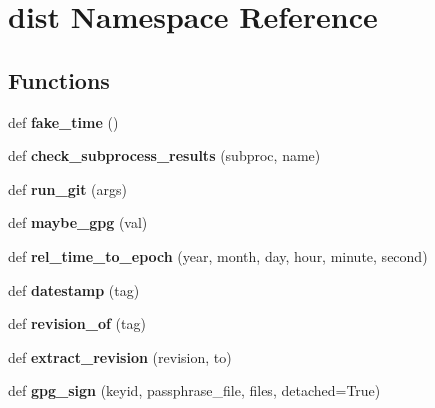 \hypertarget{namespacedist}{}\section{dist Namespace Reference}
\label{namespacedist}
\subsection*{Functions}
\begin{DoxyCompactItemize}
\item 
\mbox{\label{namespacedist_abacdc32a57a28af799d1d1c667ca5993}} 
def {\bfseries fake\+\_\+time} ()
\item 
\mbox{\label{namespacedist_a73d52a90d4d282ed503a285bb8e6e854}} 
def {\bfseries check\+\_\+subprocess\+\_\+results} (subproc, name)
\item 
\mbox{\label{namespacedist_a6e578877c9b9c9e4423cc15a77379406}} 
def {\bfseries run\+\_\+git} (args)
\item 
\mbox{\label{namespacedist_ab08be75c608432a3f9b0ca060452c732}} 
def {\bfseries maybe\+\_\+gpg} (val)
\item 
\mbox{\label{namespacedist_a2f2cac46faa252ca2c240089d5952a6f}} 
def {\bfseries rel\+\_\+time\+\_\+to\+\_\+epoch} (year, month, day, hour, minute, second)
\item 
\mbox{\label{namespacedist_a0cd94e5dcfbc11ca6c5df254de48d819}} 
def {\bfseries datestamp} (tag)
\item 
\mbox{\label{namespacedist_ad8cc50bdd5e59a2edc22b5848a5bbd0b}} 
def {\bfseries revision\+\_\+of} (tag)
\item 
\mbox{\label{namespacedist_a70a5c98f3d119c2aa3579064b94000b8}} 
def {\bfseries extract\+\_\+revision} (revision, to)
\item 
\mbox{\label{namespacedist_a4597d65dcf97cef0e49f65fdbfed08f1}} 
def {\bfseries gpg\+\_\+sign} (keyid, passphrase\+\_\+file, files, detached=True)
\item 
\mbox{\label{namespacedist_a24b37a90db21c35502645a0ca917d08d}} 

\end{DoxyCompactItemize}
